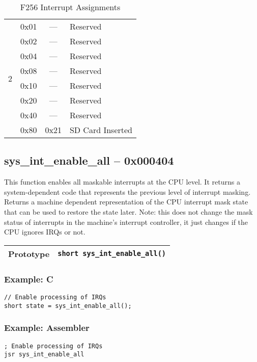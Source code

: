 \begin{table}
\begin{center}
\begin{tabular}{|c|c||c|l|}
            \multirow{8}{*}{2} & 0x01 & --- & Reserved \\ \cline{2-4}
                & 0x02 & --- & Reserved \\ \cline{2-4}
                & 0x04 & --- & Reserved \\ \cline{2-4}
                & 0x08 & --- & Reserved \\ \cline{2-4}
                & 0x10 & --- & Reserved \\ \cline{2-4}
                & 0x20 & --- & Reserved \\ \cline{2-4}
                & 0x40 & --- & Reserved \\ \cline{2-4}
                & 0x80 & 0x21 & SD Card Inserted \\ \hline
        \end{tabular}
    \end{center}
    \caption{F256 Interrupt Assignments}
\end{table}

\subsection*{sys\_int\_enable\_all -- 0x000404}
This function enables all maskable interrupts at the CPU level. It returns a system-dependent code that represents the previous level of interrupt masking.
Returns a machine dependent representation of the CPU interrupt mask state that can be used to restore the state later.
Note: this does not change the mask status of interrupts in the machine's interrupt controller, it just changes if the CPU ignores IRQs or not.

\bigskip

\begin{tabular}{|l||l|} \hline
Prototype & \lstinline!short sys_int_enable_all()! \\ \hline
\end{tabular}

\subsubsection*{Example: C}
\begin{lstlisting}
// Enable processing of IRQs
short state = sys_int_enable_all();
\end{lstlisting}

\subsubsection*{Example: Assembler}
\begin{verbatim}
; Enable processing of IRQs
jsr sys_int_enable_all
\end{verbatim}

